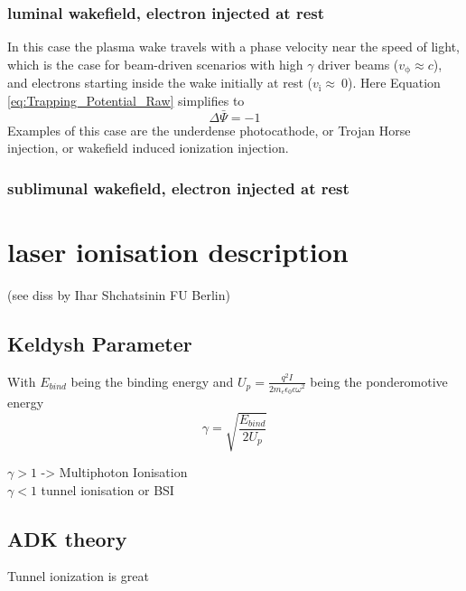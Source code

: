 \subsubsection{luminal wakefield, electron injected  at rest}
In this case the plasma wake travels with a phase velocity near the speed of light, which is the case for beam-driven scenarios with high $\gamma$ driver beams ($v_\mathrm{\phi} \approx c$), and electrons starting inside the wake initially at rest ($v_\mathrm{i} \approx \ 0$).
Here Equation \ref{eq:Trapping_Potential_Raw} simplifies to
\begin{equation}
\Delta \bar{\Psi}=-1
\end{equation}
Examples of this case are the underdense photocathode, or Trojan Horse injection, or wakefield induced ionization injection.
\subsubsection{sublimunal wakefield, electron injected at rest}
\section{laser ionisation description}
(see diss by Ihar Shchatsinin FU Berlin)
	
\subsection{Keldysh Parameter}

With $E_{bind}$ being the binding energy and $U_p=\frac{q^2 I}{2 m_e \epsilon_0 c \omega^2}$ being the ponderomotive energy 
\begin{equation}
\gamma=\sqrt{\frac{E_{bind}}{2U_p}}
\end{equation}

$\gamma >1 $ -> Multiphoton Ionisation\\
$\gamma < 1$ tunnel ionisation or BSI

\subsection{ADK theory}
Tunnel ionization is great